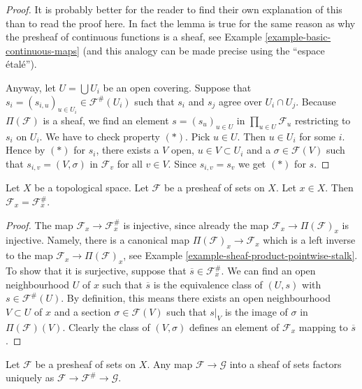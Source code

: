 \begin{proof}
It is probably better for the reader to find their own explanation
of this than to read the proof here. In fact the lemma is true
for the same reason as why the presheaf of continuous
functions is a sheaf, see Example \ref{example-basic-continuous-maps}
(and this analogy can be made precise using the ``espace \'etal\'e'').

\medskip\noindent
Anyway, let $U = \bigcup U_i$ be an open covering.
Suppose that $s_i = (s_{i, u})_{u \in U_i} \in \mathcal{F}^{\#}(U_i)$
such that $s_i$ and $s_j$ agree over $U_i \cap U_j$.
Because $\Pi(\mathcal{F})$ is a sheaf,
we find an element $s = (s_u)_{u\in U}$ in $\prod_{u\in U} \mathcal{F}_u$
restricting to $s_i$ on $U_i$. We have to check property $(*)$.
Pick $u \in U$. Then $u \in U_i$ for some $i$. Hence by $(*)$ for $s_i$,
there exists a $V$ open, $u \in V \subset U_i$
and a $\sigma \in \mathcal{F}(V)$
such that $s_{i, v} = (V, \sigma)$ in $\mathcal{F}_v$
for all $v \in V$. Since $s_{i, v} = s_v$ we get $(*)$ for $s$.
\end{proof}

\begin{lemma}
\label{lemma-stalk-sheafification}
Let $X$ be a topological space.
Let $\mathcal{F}$ be a presheaf of sets on $X$.
Let $x \in X$. Then $\mathcal{F}_x = \mathcal{F}^\#_x$.
\end{lemma}

\begin{proof}
The map $\mathcal{F}_x \to \mathcal{F}^\#_x$
is injective, since already the map
$\mathcal{F}_x \to \Pi(\mathcal{F})_x$ is injective.
Namely, there is a canonical map $\Pi(\mathcal{F})_x \to \mathcal{F}_x$
which is a left inverse to the map $\mathcal{F}_x \to \Pi(\mathcal{F})_x$,
see Example \ref{example-sheaf-product-pointwise-stalk}.
To show that it is surjective, suppose that
$\overline{s} \in \mathcal{F}^\#_x$.
We can find an open neighbourhood $U$ of $x$ such that
$\overline{s}$ is the equivalence class of $(U, s)$
with $s \in \mathcal{F}^\#(U)$.
By definition, this means there exists an open neighbourhood
$V \subset U$ of $x$ and a section $\sigma \in \mathcal{F}(V)$
such that $s|_V$ is the image of $\sigma$ in $\Pi(\mathcal{F})(V)$.
Clearly the class of $(V, \sigma)$ defines an element of
$\mathcal{F}_x$ mapping to $\overline{s}$.
\end{proof}

\begin{lemma}
\label{lemma-sheafify-universal}
Let $\mathcal{F}$ be a presheaf of sets on $X$.
Any map $\mathcal{F} \to \mathcal{G}$ into a sheaf of sets
factors uniquely as
$\mathcal{F} \to \mathcal{F}^\# \to \mathcal{G}$.
\end{lemma}

